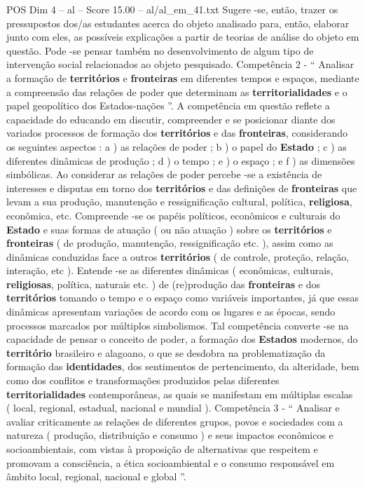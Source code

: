 \begin{textsample}{POS Dim 4 – al – Score 15.00 – al/al\_em\_41.txt}
Sugere -se, então, trazer os pressupostos dos/as estudantes acerca do objeto analisado para, então, elaborar junto com eles, as possíveis explicações a partir de teorias de análise do objeto em questão.
Pode -se pensar também no desenvolvimento de algum tipo de intervenção social relacionados ao objeto pesquisado.
Competência 2 - “ Analisar a formação de \textbf{territórios} e \textbf{fronteiras} em diferentes tempos e espaços, mediante a compreensão das relações de poder que determinam as \textbf{territorialidades} e o papel geopolítico dos Estados-nações ”.
A competência em questão reflete a capacidade do educando em discutir, compreender e se posicionar diante dos variados processos de formação dos \textbf{territórios} e das \textbf{fronteiras}, considerando os seguintes aspectos : a ) as relações de poder ; b ) o papel do \textbf{Estado} ; c ) as diferentes dinâmicas de produção ; d ) o tempo ; e ) o espaço ; e f ) as dimensões simbólicas.
Ao considerar as relações de poder percebe -se a existência de interesses e disputas em torno dos \textbf{territórios} e das definições de \textbf{fronteiras} que levam a sua produção, manutenção e ressignificação cultural, política, \textbf{religiosa}, econômica, etc.
Compreende -se os papéis políticos, econômicos e culturais do \textbf{Estado} e suas formas de atuação ( ou não atuação ) sobre os \textbf{territórios} e \textbf{fronteiras} ( de produção, manutenção, ressignificação etc. ), assim como as dinâmicas conduzidas face a outros \textbf{territórios} ( de controle, proteção, relação, interação, etc ).
Entende -se as diferentes dinâmicas ( econômicas, culturais, \textbf{religiosas}, política, naturais etc. ) de (re)produção das \textbf{fronteiras} e dos \textbf{territórios} tomando o tempo e o espaço como variáveis importantes, já que essas dinâmicas apresentam variações de acordo com os lugares e as épocas, sendo processos marcados por múltiplos simbolismos.
Tal competência converte -se na capacidade de pensar o conceito de poder, a formação dos \textbf{Estados} modernos, do \textbf{território} brasileiro e alagoano, o que se desdobra na problematização da formação das \textbf{identidades}, dos sentimentos de pertencimento, da alteridade, bem como dos conflitos e transformações produzidos pelas diferentes \textbf{territorialidades} contemporâneas, as quais se manifestam em múltiplas escalas ( local, regional, estadual, nacional e mundial ).
Competência 3 - “ Analisar e avaliar criticamente as relações de diferentes grupos, povos e sociedades com a natureza ( produção, distribuição e consumo ) e seus impactos econômicos e socioambientais, com vistas à proposição de alternativas que respeitem e promovam a consciência, a ética socioambiental e o consumo responsável em âmbito local, regional, nacional e global ”.

\end{textsample}
